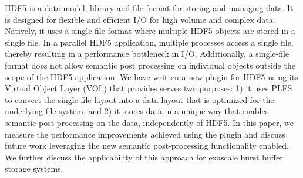 HDF5 is a data model, library and file format for storing and managing data. It is designed for flexible and efficient I/O for high volume and complex data. Natively, it uses a single-file format where multiple HDF5 objects are stored in a single file. In a parallel HDF5 application, multiple processes access a single file, thereby resulting in a performance bottleneck in I/O. Additionally, a single-file format does not allow semantic post processing on individual objects outside the scope of the HDF5 application. We have written a new plugin for HDF5 using its Virtual Object Layer (VOL) that provides serves two purposes: 1) it uses PLFS to convert the single-file layout into a data layout that is optimized for the underlying file system, and 2) it stores data in a unique way that enables semantic post-processing on the data, independently of HDF5. In this paper, we measure the performance improvements achieved using the plugin and discuss future work leveraging the new semantic post-processing functionality enabled.  We further discuss the applicability of this approach for exascale burst buffer storage systems.
